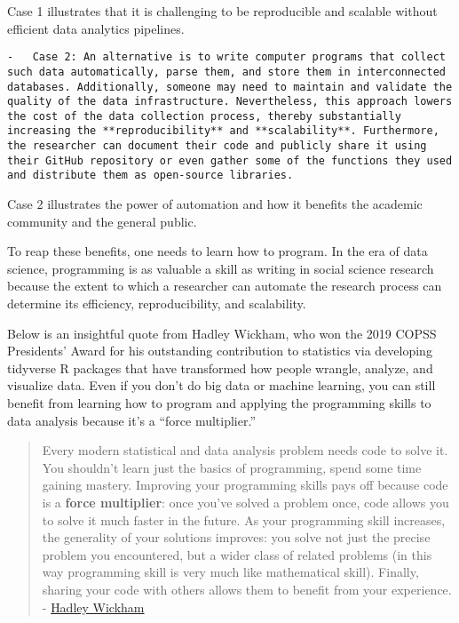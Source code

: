 \documentclass[
]{book}
\begin{document}
Case 1 illustrates that it is challenging to be reproducible and scalable without efficient data analytics pipelines.

\begin{verbatim}
-   Case 2: An alternative is to write computer programs that collect such data automatically, parse them, and store them in interconnected databases. Additionally, someone may need to maintain and validate the quality of the data infrastructure. Nevertheless, this approach lowers the cost of the data collection process, thereby substantially increasing the **reproducibility** and **scalability**. Furthermore, the researcher can document their code and publicly share it using their GitHub repository or even gather some of the functions they used and distribute them as open-source libraries.
\end{verbatim}

Case 2 illustrates the power of automation and how it benefits the academic community and the general public.

To reap these benefits, one needs to learn how to program. In the era of data science, programming is as valuable a skill as writing in social science research because the extent to which a researcher can automate the research process can determine its efficiency, reproducibility, and scalability.

Below is an insightful quote from Hadley Wickham, who won the 2019 COPSS Presidents' Award for his outstanding contribution to statistics via developing tidyverse R packages that have transformed how people wrangle, analyze, and visualize data. Even if you don't do big data or machine learning, you can still benefit from learning how to program and applying the programming skills to data analysis because it's a ``force multiplier.''

\begin{quote}
Every modern statistical and data analysis problem needs code to solve it. You shouldn't learn just the basics of programming, spend some time gaining mastery. Improving your programming skills pays off because code is a \textbf{force multiplier}: once you've solved a problem once, code allows you to solve it much faster in the future. As your programming skill increases, the generality of your solutions improves: you solve not just the precise problem you encountered, but a wider class of related problems (in this way programming skill is very much like mathematical skill). Finally, sharing your code with others allows them to benefit from your experience. - \href{https://imstat.org/2014/12/16/hadley-wickham-impact-the-world-by-being-useful/}{Hadley Wickham}
\end{quote}
\end{document}

